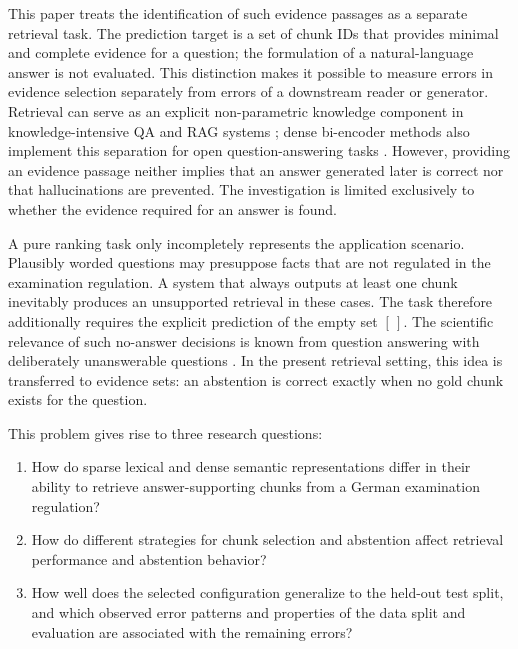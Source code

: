 \documentclass[11pt]{article}
\begin{document}
This paper treats the identification of such evidence passages as a separate retrieval task. The prediction target is a set of chunk IDs that provides minimal and complete evidence for a question; the formulation of a natural-language answer is not evaluated. This distinction makes it possible to measure errors in evidence selection separately from errors of a downstream reader or generator. Retrieval can serve as an explicit non-parametric knowledge component in knowledge-intensive QA and RAG systems \citep{lewis2020rag}; dense bi-encoder methods also implement this separation for open question-answering tasks \citep{karpukhin-etal-2020-dense}. However, providing an evidence passage neither implies that an answer generated later is correct nor that hallucinations are prevented. The investigation is limited exclusively to whether the evidence required for an answer is found.

A pure ranking task only incompletely represents the application scenario. Plausibly worded questions may presuppose facts that are not regulated in the examination regulation. A system that always outputs at least one chunk inevitably produces an unsupported retrieval in these cases. The task therefore additionally requires the explicit prediction of the empty set $[\,]$. The scientific relevance of such no-answer decisions is known from question answering with deliberately unanswerable questions \citep{rajpurkar-etal-2018-know}. In the present retrieval setting, this idea is transferred to evidence sets: an abstention is correct exactly when no gold chunk exists for the question.

This problem gives rise to three research questions:

\begin{enumerate}
    \item[\textbf{RQ1}] How do sparse lexical and dense semantic representations differ in their ability to retrieve answer-supporting chunks from a German examination regulation?
    \item[\textbf{RQ2}] How do different strategies for chunk selection and abstention affect retrieval performance and abstention behavior?
    \item[\textbf{RQ3}] How well does the selected configuration generalize to the held-out test split, and which observed error patterns and properties of the data split and evaluation are associated with the remaining errors?
\end{enumerate}
\end{document}
